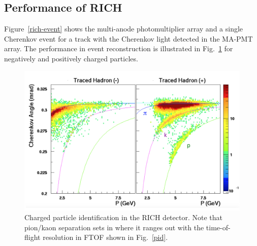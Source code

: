 \documentclass[final,3p,times,twocolumn,authoryear]{elsarticle}
\begin{document}
\subsection{\rm Performance of RICH} 
 Figure~\ref{rich-event} shows the multi-anode photomultiplier array 
and a single Cherenkov event for a track with the Cherenkov light detected in the MA-PMT array.  The performance in event reconstruction is illustrated in Fig.~\ref{rich_rec} for negatively and positively charged particles. 
\begin{figure}[htbp!]
\centerline{\includegraphics[width=1.0\columnwidth]{RICH_rec.png}}
\caption{Charged particle identification in the RICH detector. Note that pion/kaon separation sets in where it ranges out with 
 the time-of-flight resolution in FTOF shown in Fig.~\ref{pid}.}
\label{rich_rec}
\end{figure}
\end{document}
